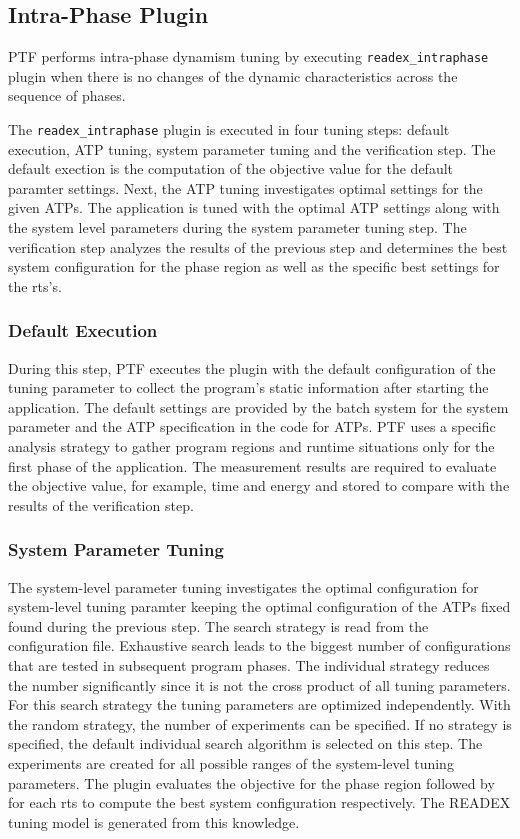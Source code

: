 \subsection{Intra-Phase Plugin} \label{sec:intra-phase}

PTF performs intra-phase dynamism tuning by executing \texttt{readex\_intraphase} plugin when there is no changes of the dynamic characteristics across the sequence of phases.  

The \texttt{readex\_intraphase} plugin is executed in four tuning steps: default execution, ATP tuning, system parameter tuning and the verification step. The default exection is the computation of the objective value for the default paramter settings. Next, the ATP tuning investigates optimal settings for the given ATPs. The application is tuned with the optimal ATP settings along with the system level parameters during the system parameter tuning step. The verification step analyzes the results of the previous step and determines the best system configuration for the phase region as well as the specific best settings for the rts's.

\subsubsection{Default Execution} \label{intra-default-execution} 

During this step, PTF executes the plugin with the default configuration of the tuning parameter to collect the program's static information after starting the application. The default settings are provided by the batch system for the system parameter and the ATP specification in the code for ATPs. PTF uses a specific analysis strategy to gather program regions and runtime situations only for the first phase of the application. The measurement results are required to evaluate the objective value, for example, time and energy and stored to compare with the results of the verification step.

\subsubsection{System Parameter Tuning} \label{sys-tuning} 

The system-level parameter tuning investigates the optimal configuration for system-level tuning paramter keeping the optimal configuration of the ATPs fixed found during the previous step. The search strategy is read from the configuration file. Exhaustive search leads to the biggest number of configurations that are tested in subsequent program phases. The individual strategy reduces the number significantly since it is not the cross product of all tuning parameters. For this search strategy the tuning parameters are optimized independently. With the random strategy, the number of experiments can be specified. If no strategy is specified, the default individual search algorithm is selected on this step. The experiments are created for all possible ranges of the system-level tuning parameters. The plugin evaluates the objective for the phase region followed by for each rts to compute the best system configuration respectively. The READEX tuning model is generated from this knowledge. 

